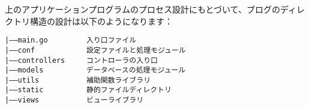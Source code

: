 上のアプリケーションプログラムのプロセス設計にもとづいて、ブログのディレクトリ構造の設計は以下のようになります：

\begin{lstlisting}[numbers=none]
|——main.go         入り口ファイル
|——conf            設定ファイルと処理モジュール
|——controllers     コントローラの入り口
|——models          データベースの処理モジュール
|——utils           補助関数ライブラリ
|——static          静的ファイルディレクトリ
|——views           ビューライブラリ
\end{lstlisting}
